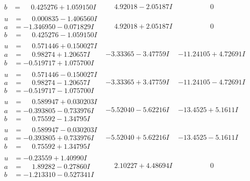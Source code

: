 \documentclass[1p]{elsarticle_modified}
\theoremstyle{definition}
\begin{document}
$$\begin{array}{c|c|c}
\begin{aligned}
b &= \phantom{-}0.425276 + 1.059150 I\end{aligned}
 & \phantom{-}4.92018 - 2.05187 I & \phantom{-0.000000 } 0 \\ \hline\begin{aligned}
u &= \phantom{-}0.000835 - 1.406560 I \\
a &= -1.346950 - 0.071829 I \\
b &= \phantom{-}0.425276 - 1.059150 I\end{aligned}
 & \phantom{-}4.92018 + 2.05187 I & \phantom{-0.000000 } 0 \\ \hline\begin{aligned}
u &= \phantom{-}0.571446 + 0.150027 I \\
a &= \phantom{-}0.98274 + 1.20657 I \\
b &= -0.519717 + 1.075700 I\end{aligned}
 & -3.33365 - 3.47759 I & -11.24105 + 4.72691 I \\ \hline\begin{aligned}
u &= \phantom{-}0.571446 - 0.150027 I \\
a &= \phantom{-}0.98274 - 1.20657 I \\
b &= -0.519717 - 1.075700 I\end{aligned}
 & -3.33365 + 3.47759 I & -11.24105 - 4.72691 I \\ \hline\begin{aligned}
u &= \phantom{-}0.589947 + 0.030203 I \\
a &= -0.393805 - 0.733976 I \\
b &= \phantom{-}0.75592 - 1.34795 I\end{aligned}
 & -5.52040 - 5.62216 I & -13.4525 + 5.1611 I \\ \hline\begin{aligned}
u &= \phantom{-}0.589947 - 0.030203 I \\
a &= -0.393805 + 0.733976 I \\
b &= \phantom{-}0.75592 + 1.34795 I\end{aligned}
 & -5.52040 + 5.62216 I & -13.4525 - 5.1611 I \\ \hline\begin{aligned}
u &= -0.23559 + 1.40990 I \\
a &= \phantom{-}1.89282 - 0.27860 I \\
b &= -1.213310 - 0.527341 I\end{aligned}
 & \phantom{-}2.10227 + 4.48694 I & \phantom{-0.000000 } 0 \\ \hline\begin{aligned}

\end{aligned}
\end{array}$$
\end{document}
